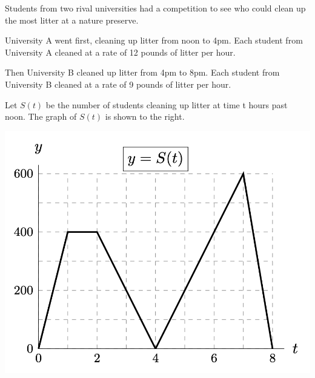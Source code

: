 \documentclass[11pt]{exam}
\begin{document}
\begin{questions}
  \begin{minipage}{0.5\linewidth}
    Students from two rival universities had a competition to see who
    could clean up the most litter at a nature preserve.

    University A went first, cleaning up litter from noon to 4pm. Each
    student from University A cleaned at a rate of 12 pounds of litter
    per hour.

    
    Then University B cleaned up litter from 4pm to 8pm.  Each student
    from University B cleaned at a rate of 9 pounds of litter per
    hour.

    Let \(S(t)\) be the number of students cleaning up litter at time
    t hours past noon. The graph of \(S(t)\) is shown to the right.
  \end{minipage}
  \begin{minipage}{0.5\linewidth}
    \includegraphics[scale=0.5]{Figures/graph_w19}
  \end{minipage}
\end{questions}
\end{document}

